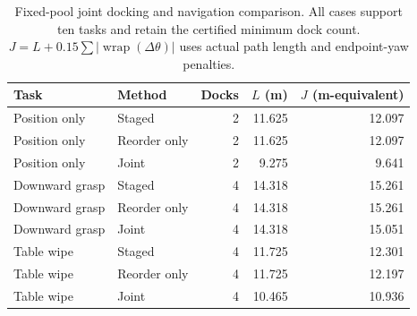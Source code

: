 \begin{table}[t]
\centering
\caption{Fixed-pool joint docking and navigation comparison. All cases support ten tasks and retain the certified minimum dock count. $J=L+0.15\sum|\operatorname{wrap}(\Delta\theta)|$ uses actual path length and endpoint-yaw penalties.}
\label{tab:joint-task-navigation}
\begin{tabular}{llrrr}
\toprule
Task & Method & Docks & $L$ (m) & $J$ (m-equivalent) \\
\midrule
Position only & Staged & 2 & 11.625 & 12.097 \\
Position only & Reorder only & 2 & 11.625 & 12.097 \\
Position only & Joint & 2 & 9.275 & 9.641 \\
Downward grasp & Staged & 4 & 14.318 & 15.261 \\
Downward grasp & Reorder only & 4 & 14.318 & 15.261 \\
Downward grasp & Joint & 4 & 14.318 & 15.051 \\
Table wipe & Staged & 4 & 11.725 & 12.301 \\
Table wipe & Reorder only & 4 & 11.725 & 12.197 \\
Table wipe & Joint & 4 & 10.465 & 10.936 \\
\bottomrule
\end{tabular}
\end{table}

